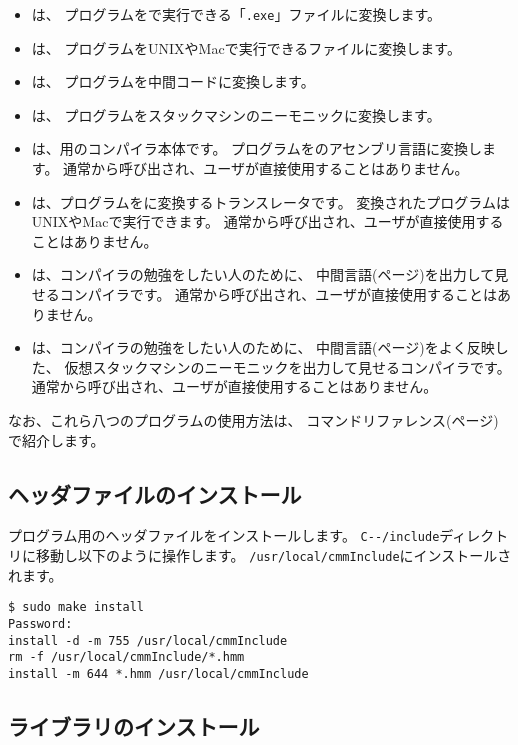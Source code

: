 \begin{itemize}
\item {\cme}は、
{\cmm}プログラムを{\tac}で実行できる「{\tt .exe}」ファイルに変換します。
\item {\cmc}は、
{\cmm}プログラムをUNIXやMacで実行できるファイルに変換します。
\item {\cmi}は、
{\cmm}プログラムを中間コードに変換します。
\item {\cmv}は、
{\cmm}プログラムをスタックマシンのニーモニックに変換します。
\item {\cmmc}は、{\tac}用の{\cmml}コンパイラ本体です。
{\cmm}プログラムを{\tac}のアセンブリ言語に変換します。
通常{\cme}から呼び出され、ユーザが直接使用することはありません。
\item {\ccmmc}は、{\cmm}プログラムを{\cl}に変換するトランスレータです。
変換された{\cl}プログラムはUNIXやMacで実行できます。
通常{\cmc}から呼び出され、ユーザが直接使用することはありません。
\item {\icmmc}は、コンパイラの勉強をしたい人のために、
中間言語(\pageref{app:vm}ページ)を出力して見せるコンパイラです。
通常{\cmi}から呼び出され、ユーザが直接使用することはありません。
\item {\vcmmc}は、コンパイラの勉強をしたい人のために、
中間言語(\pageref{app:vm}ページ)をよく反映した、
仮想スタックマシンのニーモニックを出力して見せるコンパイラです。
通常{\cmv}から呼び出され、ユーザが直接使用することはありません。
\end{itemize}

なお、これら八つのプログラムの使用方法は、
コマンドリファレンス(\pageref{app:command}ページ)で紹介します。

\subsection{ヘッダファイルのインストール}

{\cmml}プログラム用のヘッダファイルをインストールします。
\verb;C--/include;ディレクトリに移動し以下のように操作します。
\verb;/usr/local/cmmInclude;にインストールされます。

\begin{mylist}
\begin{verbatim}
$ sudo make install
Password:
install -d -m 755 /usr/local/cmmInclude
rm -f /usr/local/cmmInclude/*.hmm
install -m 644 *.hmm /usr/local/cmmInclude
\end{verbatim}
\end{mylist}

\subsection{ライブラリのインストール}

